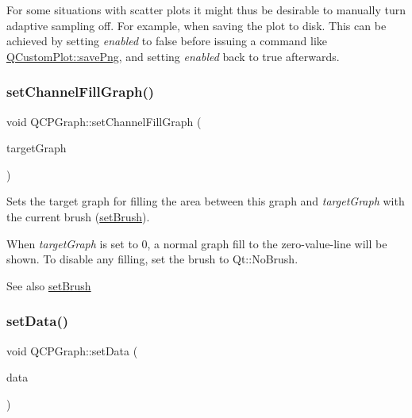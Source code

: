 For some situations with scatter plots it might thus be desirable to manually turn adaptive sampling off. For example, when saving the plot to disk. This can be achieved by setting {\itshape enabled} to false before issuing a command like \hyperlink{class_q_custom_plot_ac92cc9256d12f354b40a4be4600b5fb9}{Q\+Custom\+Plot\+::save\+Png}, and setting {\itshape enabled} back to true afterwards. \mbox{\label{class_q_c_p_graph_a2d03156df1b64037a2e36cfa50351ca3}} 
\subsubsection{\texorpdfstring{set\+Channel\+Fill\+Graph()}{setChannelFillGraph()}}
{\footnotesize\ttfamily void Q\+C\+P\+Graph\+::set\+Channel\+Fill\+Graph (\begin{DoxyParamCaption}\item[{\hyperlink{class_q_c_p_graph}{Q\+C\+P\+Graph} $\ast$}]{target\+Graph }\end{DoxyParamCaption})}

Sets the target graph for filling the area between this graph and {\itshape target\+Graph} with the current brush (\hyperlink{class_q_c_p_abstract_plottable_a7a4b92144dca6453a1f0f210e27edc74}{set\+Brush}).

When {\itshape target\+Graph} is set to 0, a normal graph fill to the zero-\/value-\/line will be shown. To disable any filling, set the brush to Qt\+::\+No\+Brush.

\begin{DoxySeeAlso}{See also}
\hyperlink{class_q_c_p_abstract_plottable_a7a4b92144dca6453a1f0f210e27edc74}{set\+Brush} 
\end{DoxySeeAlso}
\mbox{\label{class_q_c_p_graph_a1eae9429a316b008e2d99b2d65a54395}} 
\subsubsection{\texorpdfstring{set\+Data()}{setData()}\hspace{0.1cm}{\footnotesize\ttfamily [1/2]}}
{\footnotesize\ttfamily void Q\+C\+P\+Graph\+::set\+Data (\begin{DoxyParamCaption}\item[{Q\+Shared\+Pointer$<$ \hyperlink{class_q_c_p_data_container}{Q\+C\+P\+Graph\+Data\+Container} $>$}]{data }\end{DoxyParamCaption})}

